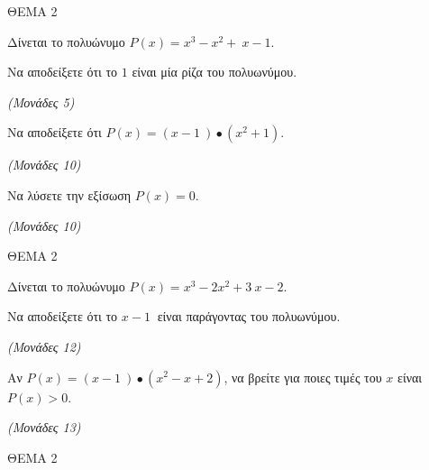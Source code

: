 \documentclass[11pt,a4paper,twoside]{book}
\newcommand{\monades}[1]{\hfill \textit{(Μονάδες #1)}}
\begin{document}
\vspace{4mm}

ΘΕΜΑ 2

Δίνεται το πολυώνυμο $P(x) = x^{3} - x^{2} + \ x - 1$.

\begin{alist}
\item Να αποδείξετε ότι το $1$ είναι μία ρίζα του πολυωνύμου.

\monades{5}

\item Να αποδείξετε ότι $P(x) = (x - 1\ ) \bullet (x^{2} + 1)$.

\monades{10}

\item Να λύσετε την εξίσωση $P(x) = 0$.

\monades{10}
\end{alist}

\vspace{4mm}

ΘΕΜΑ 2

Δίνεται το πολυώνυμο $P(x) = x^{3} - 2x^{2} + 3\ x - 2$.

\begin{alist}
\item Να αποδείξετε ότι το $x - 1\ $ είναι παράγοντας του πολυωνύμου.

\monades{12}

\item Αν $P(x) = (x - 1\ ) \bullet (x^{2} - x + 2)$, να βρείτε για ποιες τιμές του $x$ είναι $P(x) > 0$.

\monades{13}
\end{alist}

\vspace{4mm}

ΘΕΜΑ 2
\end{document}
